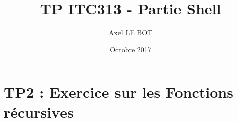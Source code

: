 \documentclass{article}
\title{TP ITC313 - Partie Shell}
\author{Axel LE BOT}
\date{Octobre 2017}
\begin{document}
\maketitle
\tableofcontents



\chapter{TP2 : Exercice sur les Fonctions récursives}
\end{document}
